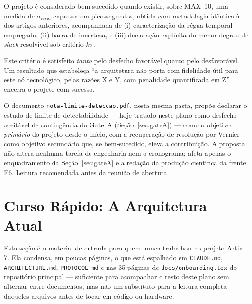 \documentclass[11pt,a4paper]{article}
\begin{document}
\begin{okbox}[title={Definição de pronto}]
O projeto é considerado bem-sucedido quando existir, sobre MAX~10, uma medida de
$\sigma_\text{resid}$ expressa em picossegundos, obtida com metodologia idêntica à
dos artigos anteriores, acompanhada de (i) caracterização da régua temporal empregada,
(ii) barra de incerteza, e (iii) declaração explícita do menor degrau de \emph{slack}
resolvível sob critério $k\sigma$.

Este critério é satisfeito \emph{tanto} pelo desfecho favorável quanto pelo desfavorável.
Um resultado que estabeleça ``a arquitetura não porta com fidelidade útil para este nó
tecnológico, pelas razões X e Y, com penalidade quantificada em Z'' encerra o projeto
com sucesso.
\end{okbox}

\begin{keybox}[title={Nota complementar de direcionamento}]
O documento \texttt{nota-limite-deteccao.pdf}, nesta mesma pasta, propõe declarar o
estudo de limite de detectabilidade --- hoje tratado neste plano como desfecho
aceitável de contingência do Gate~A (Seção~\ref{sec:gateA}) --- como o objetivo
\emph{primário} do projeto desde o início, com a recuperação de resolução por
Vernier como objetivo secundário que, se bem-sucedido, eleva a contribuição.
A proposta não altera nenhuma tarefa de engenharia nem o cronograma; afeta apenas
o enquadramento da Seção~\ref{sec:gateA} e a redação da produção científica da
frente F6. Leitura recomendada antes da reunião de abertura.
\end{keybox}

\section{Curso Rápido: A Arquitetura Atual}
\label{sec:crashcourse}

Esta seção é o material de entrada para quem nunca trabalhou no projeto Artix-7. Ela
condensa, em poucas páginas, o que está espalhado em \texttt{CLAUDE.md},
\texttt{ARCHITECTURE.md}, \texttt{PROTOCOL.md} e nas 35 páginas de
\texttt{docs/onboarding.tex} do repositório principal --- suficiente para acompanhar
o resto deste plano sem alternar entre documentos, mas não um substituto para a
leitura completa daqueles arquivos antes de tocar em código ou hardware.
\end{document}
